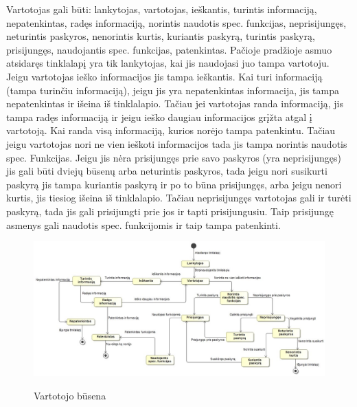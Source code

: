 ﻿\documentclass{VUMIFPSkursinis}
\begin{document}
Vartotojas gali būti: lankytojas, vartotojas, ieškantis, turintis informaciją, nepatenkintas, radęs informaciją, norintis naudotis spec. funkcijas, neprisijungęs, neturintis paskyros, nenorintis kurtis, kuriantis paskyrą, turintis paskyrą, prisijungęs, naudojantis spec. funkcijas, patenkintas. Pačioje pradžioje asmuo atsidaręs tinklalapį yra tik lankytojas, kai jis naudojasi juo tampa vartotoju. Jeigu vartotojas ieško informacijos jis tampa ieškantis. Kai turi informaciją (tampa turinčiu informaciją), jeigu jis yra nepatenkintas informacija, jis tampa nepatenkintas ir išeina iš tinklalapio. Tačiau jei vartotojas randa informaciją, jis tampa radęs informaciją ir jeigu ieško daugiau informacijos grįžta atgal į vartotoją. Kai randa visą informaciją, kurios norėjo tampa patenkintu. Tačiau jeigu vartotojas nori ne vien ieškoti informacijos tada jis tampa norintis naudotis spec. Funkcijas. Jeigu jis nėra prisijungęs prie savo paskyros (yra neprisijungęs) jis gali būti dviejų būsenų arba neturintis paskyros, tada jeigu nori susikurti paskyrą jis tampa kuriantis paskyrą ir po to būna prisijungęs, arba jeigu nenori kurtis, jis tiesiog išeina iš tinklalapio. Tačiau neprisijungęs vartotojas gali ir turėti paskyrą, tada jis gali prisijungti prie jos ir tapti prisijungusiu. Taip prisijungę asmenys gali naudotis spec. funkcijomis ir taip tampa patenkinti.

\begin{figure} [H]
	\centering
    \includegraphics[scale=0.45]{img/Pav/VartotojoBusena}
	\label{uml:30}
	\caption{Vartotojo būsena}
\end{figure}
\end{document}
